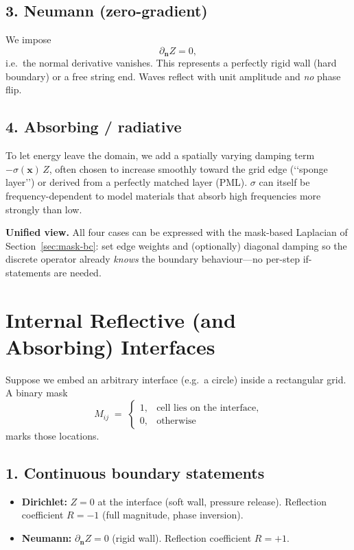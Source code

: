 \documentclass{article}
\begin{document}
\subsection*{3. Neumann (zero-gradient)}

We impose
\[
\partial_{\mathbf n}Z = 0,
\]
i.e.\ the normal derivative vanishes.  This represents a perfectly rigid
wall (hard boundary) or a free string end.  Waves reflect with unit
amplitude and \emph{no} phase flip.

\subsection*{4. Absorbing / radiative}

To let energy leave the domain, we add a spatially varying damping term
\(-\sigma(\mathbf x)\,Z\), often chosen to increase smoothly toward the
grid edge (‘‘sponge layer’’) or derived from a perfectly matched layer
(PML).  \(\sigma\) can itself be frequency-dependent to model materials
that absorb high frequencies more strongly than low.

\bigskip
\noindent
\textbf{Unified view.}  All four cases can be expressed with the mask-based
Laplacian of Section~\ref{sec:mask-bc}: set edge weights and (optionally)
diagonal damping so the discrete operator already \emph{knows} the
boundary behaviour—no per-step if-statements are needed.

\newpage
\section*{Internal Reflective (and Absorbing) Interfaces}
\label{sec:mask-bc}

Suppose we embed an arbitrary interface (e.g.\ a circle) inside a
rectangular grid.  A binary mask
\[
M_{ij}\;=\;\begin{cases}
1, & \text{cell lies on the interface},\\
0, & \text{otherwise}
\end{cases}
\]
marks those locations.

\subsection*{1. Continuous boundary statements}

\begin{itemize}
  \item \textbf{Dirichlet:} \(Z=0\) at the interface  
        (soft wall, pressure release).  Reflection coefficient
        \(R=-1\) (full magnitude, phase inversion).
  \item \textbf{Neumann:} \(\partial_{\mathbf n}Z=0\)  
        (rigid wall).  Reflection coefficient \(R=+1\).
\end{itemize}
\end{document}
